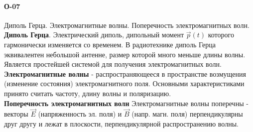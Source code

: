 \documentclass[__main__.tex]{subfiles}
\begin{document}
\paragraph{О-07} Диполь Герца. Электромагнитные волны. Поперечность электромагнитных волн.\\

\textbf{Диполь Герца}. Электрический диполь, дипольный момент $\vec{p}(t)$ которого гармонически изменяется со временем. В радиотехнике диполь Герца эквивалентен небольшой антенне, размер которой много меньше длины волны. Является простейшей системой для получения электромагнитных волн.\\

\textbf{Электромагнитные волны} - распространяющееся в пространстве возмущения (изменение состояния) электромагнитного поля. Основными характеристиками принято считать частоту, длину волны и поляризацию. \\

\textbf{Поперечность электромагнитных волн} Электромагнитные волны поперечны - векторы $\vec{E}$ (напряженность эл. поля) и $\vec{B}$ (напр. магн. поля) перпендикулярны друг другу и лежат в плоскости, перпендикулярной распространению волны. \\
\end{document}
